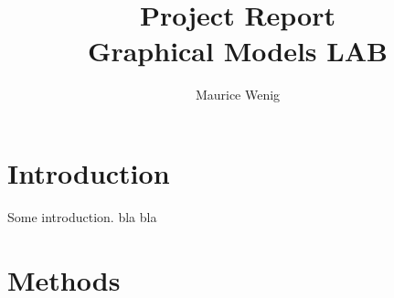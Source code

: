 \documentclass[sigconf, fleqn]{acmart}
\begin{document}
\title[Project Report]{Project Report\\\large Graphical Models LAB}


\author{Maurice Wenig}


\maketitle



\section{Introduction}
Some introduction. bla bla

\FloatBarrier


\section{Methods}
\end{document}
